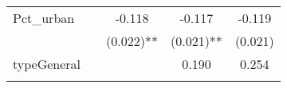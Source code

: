 \documentclass[12pt,twoside]{reedthesis}
\begin{document}
\begin{longtable}[]{@{}lcccc@{}}
  \begin{minipage}[t]{0.26\columnwidth}\raggedright\strut
  Pct\_urban\strut
  \end{minipage} & \begin{minipage}[t]{0.12\columnwidth}\centering\strut
  \strut
  \end{minipage} & \begin{minipage}[t]{0.14\columnwidth}\centering\strut
  -0.118\strut
  \end{minipage} & \begin{minipage}[t]{0.14\columnwidth}\centering\strut
  -0.117\strut
  \end{minipage} & \begin{minipage}[t]{0.11\columnwidth}\centering\strut
  -0.119\strut
  \end{minipage}\tabularnewline
  \begin{minipage}[t]{0.26\columnwidth}\raggedright\strut
  \strut
  \end{minipage} & \begin{minipage}[t]{0.12\columnwidth}\centering\strut
  \strut
  \end{minipage} & \begin{minipage}[t]{0.14\columnwidth}\centering\strut
  (0.022)**\strut
  \end{minipage} & \begin{minipage}[t]{0.14\columnwidth}\centering\strut
  (0.021)**\strut
  \end{minipage} & \begin{minipage}[t]{0.11\columnwidth}\centering\strut
  (0.021)\strut
  \end{minipage}\tabularnewline
  \begin{minipage}[t]{0.26\columnwidth}\raggedright\strut
  typeGeneral\strut
  \end{minipage} & \begin{minipage}[t]{0.12\columnwidth}\centering\strut
  \strut
  \end{minipage} & \begin{minipage}[t]{0.14\columnwidth}\centering\strut
  \strut
  \end{minipage} & \begin{minipage}[t]{0.14\columnwidth}\centering\strut
  0.190\strut
  \end{minipage} & \begin{minipage}[t]{0.11\columnwidth}\centering\strut
  0.254\strut
  \end{minipage}\tabularnewline
  \begin{minipage}[t]{0.26\columnwidth}\raggedright\strut

\end{minipage}
\end{longtable}
\end{document}
